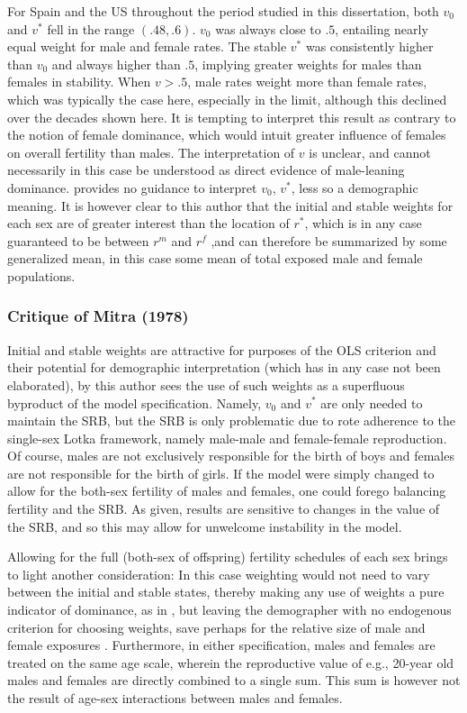 For Spain and the US throughout the period studied in this dissertation, both
$v_0$ and $v^\ast$ fell in the range $(.48,.6)$. $v_0$ was always
close to $.5$, entailing nearly equal weight for male and female rates.
The stable $v^\ast$ was consistently higher than $v_0$ and always higher than
$.5$, implying greater weights for males than females in stability. When $v > .5$, male rates weight
more than female rates, which was typically the case here, especially in the
limit, although this declined over the decades shown here. It is
tempting to interpret this result as contrary to the notion of female dominance,
which would intuit greater influence of females on overall fertility than
males. The interpretation of $v$ is unclear, and cannot necessarily in this case
be understood as direct evidence of male-leaning dominance.
\citet{mitra1978derivation} provides no guidance to interpret $v_0$, $v^\ast$,
less so a demographic meaning. It is however clear to this author that
the initial and stable weights for each sex are of greater interest
than the location of $r^\ast$, which is in any case guaranteed to be between
$r^m$ and $r^f$ ,and can therefore be summarized by some generalized mean, in
this case some mean of total exposed male and female populations.

\subsubsection{Critique of Mitra (1978)}
Initial and stable weights are attractive for purposes of the OLS
criterion and their potential for demographic interpretation (which has in any
case not been elaborated), by this author sees the use of such weights as
a superfluous byproduct of the model specification. Namely, $v_0$ and $v^\ast$
are only needed to maintain the SRB, but the SRB is only problematic due to
rote adherence to the single-sex Lotka framework, namely male-male and
female-female reproduction. Of course, males are not exclusively responsible for
the birth of boys and females are not responsible for the birth of girls. If the
model were simply changed to allow for the both-sex fertility of males and
females, one could forego balancing fertility and the SRB. As given, results are
sensitive to changes in the value of the SRB, and so this may allow for
unwelcome instability in the model.

Allowing for the full (both-sex of offspring) fertility schedules of each sex
brings to light another consideration: In this case weighting would not need to
vary between the initial and stable states, thereby making any use of weights a pure
indicator of dominance, as in \citet{goodman1967age}, but leaving the
demographer with no endogenous criterion for choosing weights, save perhaps for
the relative size of male and female exposures \citep{mitra1976effect}.
Furthermore, in either specification, males and females are treated on the same age scale, wherein the reproductive value of e.g., 20-year old males and females are
directly combined to a single sum. This sum is however not the result of age-sex
interactions between males and females.

